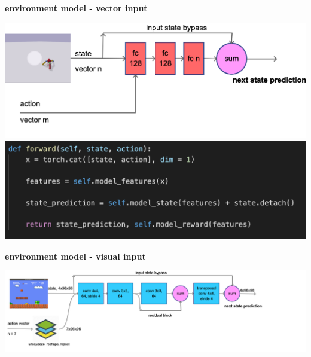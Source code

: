 \documentclass[xcolor=dvipsnames]{beamer}
\begin{document}
\begin{frame}{\bf environment model - vector input}

  {\centering \includegraphics[scale=0.15]{../diagrams/fccuriositydetail.png}}
  {\centering \includegraphics[scale=0.5]{../images/curiosity_fc.png}}

\end{frame}


\begin{frame}{\bf environment model - visual input}

  {\centering \includegraphics[scale=0.12]{../diagrams/convcuriositydetail.png}}

\end{frame}
\end{document}
